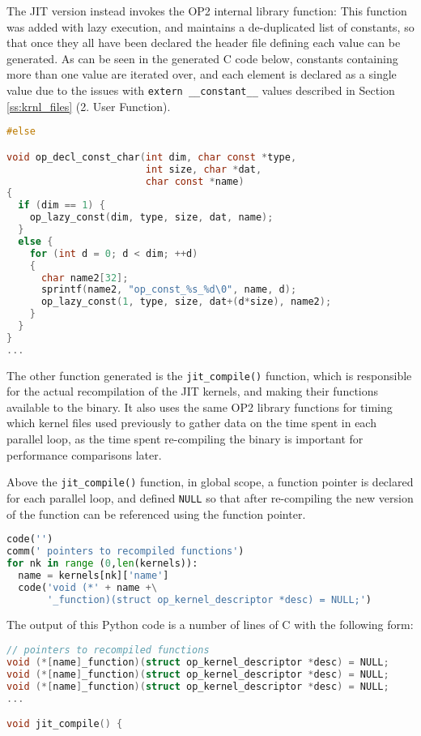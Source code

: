 The JIT version instead invokes the OP2 internal library function:
\noindent This function was added with lazy execution, and maintains a de-duplicated list of constants, so that once they all have been declared the header file defining each value can be generated. As can be seen in the generated C code below, constants containing more than one value are iterated over, and each element is declared as a single value due to the issues with \verb|extern __constant__| values described in Section \ref{ss:krnl_files} (2. User Function).
\begin{lstlisting}[backgroundcolor=\color{red!20}, language=C]
#else

void op_decl_const_char(int dim, char const *type,
                        int size, char *dat,
                        char const *name)
{
  if (dim == 1) {
    op_lazy_const(dim, type, size, dat, name);
  }
  else {
    for (int d = 0; d < dim; ++d)
    {
      char name2[32];
      sprintf(name2, "op_const_%s_%d\0", name, d);
      op_lazy_const(1, type, size, dat+(d*size), name2);
    }
  }
}
...
\end{lstlisting}
\vspace{-1em}

The other function generated is the \verb|jit_compile()| function, which is responsible for the actual recompilation of the JIT kernels, and making their functions available to the binary. It also uses the same OP2 library functions for timing which kernel files used previously to gather data on the time spent in each parallel loop, as the time spent re-compiling the binary is important for performance comparisons later.
\par
Above the \verb|jit_compile()| function, in global scope, a function pointer is declared for each parallel loop, and defined \verb|NULL| so that after re-compiling the new version of the function can be referenced using the function pointer.

\begin{lstlisting}[backgroundcolor=\color{lightgray!20}, language=Python]
code('')
comm(' pointers to recompiled functions')
for nk in range (0,len(kernels)):
  name = kernels[nk]['name']
  code('void (*' + name +\
       '_function)(struct op_kernel_descriptor *desc) = NULL;')
\end{lstlisting}
\noindent The output of this Python code is a number of lines of C with the following form:
\begin{lstlisting}[backgroundcolor=\color{red!20}, language=C]
// pointers to recompiled functions
void (*[name]_function)(struct op_kernel_descriptor *desc) = NULL;
void (*[name]_function)(struct op_kernel_descriptor *desc) = NULL;
void (*[name]_function)(struct op_kernel_descriptor *desc) = NULL;
...

void jit_compile() {
\end{lstlisting}

